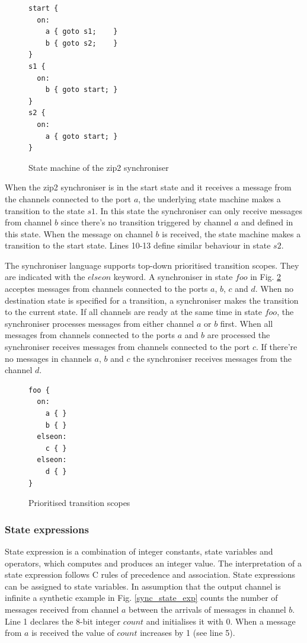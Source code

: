 \begin{figure}[h!]
\lstset{numbers=left, numberstyle=\small, stepnumber=1, numbersep=8pt}
\begin{lstlisting}[frame=single]
start {
  on:
    a { goto s1;    }
    b { goto s2;    }
}
s1 {
  on:
    b { goto start; }
}
s2 {
  on:
    a { goto start; }
}
\end{lstlisting}
\caption{State machine of the zip2 synchroniser}
\label{zip_struc}
\end{figure}

When the zip2 synchroniser is in the start state and it receives a message from the channels connected to the port $a$, the underlying state machine makes a transition to the state $s1$. In this state the synchroniser can only receive messages from channel $b$ since there's no transition triggered by channel $a$ and defined in this state. When the message on channel $b$ is received, the state machine makes a transition to the start state. Lines 10-13 define similar behaviour in state $s2$.

The synchroniser language supports top-down prioritised transition scopes. They are indicated with the $elseon$ keyword. A synchroniser in state $foo$ in Fig. \ref{sync_scope} acceptes messages from channels connected to the ports $a$, $b$, $c$ and $d$. When no destination state is specified for a transition, a synchroniser makes the transition to the current state. If all channels are ready at the same time in state $foo$, the synchroniser processes messages from either channel $a$ or $b$ first. When all messages from channels connected to the ports $a$ and $b$ are processed the synchroniser receives messages from channels connected to the port $c$. If there're no messages in channels $a$, $b$ and $c$ the synchroniser receives messages from the channel $d$.

\begin{figure}[h!]
\lstset{numbers=left, numberstyle=\small, stepnumber=1, numbersep=8pt}
\begin{lstlisting}[frame=single]
foo {
  on:
    a { }
    b { }
  elseon:
    c { }
  elseon:
    d { }
}
\end{lstlisting}
\caption{Prioritised transition scopes}
\label{sync_scope}
\end{figure}


  \subsubsection{State expressions}
State expression is a combination of integer constants, state variables and operators, which computes and produces an integer value. The interpretation of a state expression follows C rules of precedence and association. State expressions can be assigned to state variables. In assumption that the output channel is infinite a synthetic example in Fig. \ref{sync_state_exp} counts the number of messages received from channel $a$ between the arrivals of messages in channel $b$. Line 1 declares the 8-bit integer $count$ and initialises it with 0. When a message from $a$ is received the value of $count$ increases by 1 (see line 5).

